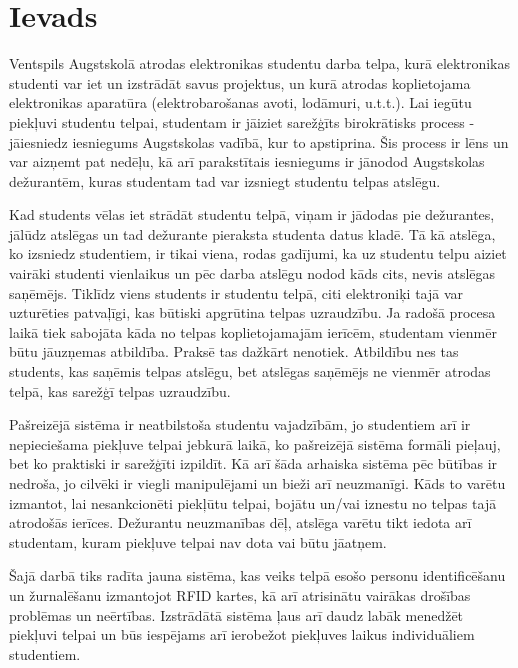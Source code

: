 \chapter*{Ievads}


Ventspils Augstskolā atrodas elektronikas studentu darba telpa, kurā elektronikas studenti var iet un izstrādāt savus projektus, un kurā atrodas koplietojama elektronikas aparatūra (elektrobarošanas avoti, lodāmuri, u.t.t.). Lai iegūtu piekļuvi studentu telpai, studentam ir jāiziet sarežģīts birokrātisks process - jāiesniedz iesniegums Augstskolas vadībā, kur to apstiprina. Šis process ir lēns un var aizņemt pat nedēļu, kā arī parakstītais iesniegums ir jānodod Augstskolas dežurantēm, kuras studentam tad var izsniegt studentu telpas atslēgu.

Kad students vēlas iet strādāt studentu telpā, viņam ir jādodas pie dežurantes, jālūdz atslēgas un tad dežurante pieraksta studenta datus kladē. Tā kā atslēga, ko izsniedz studentiem, ir tikai viena, rodas gadījumi, ka uz studentu telpu aiziet vairāki studenti vienlaikus un pēc darba atslēgu nodod kāds cits, nevis atslēgas saņēmējs. Tiklīdz viens students ir studentu telpā, citi elektroniķi tajā var uzturēties patvaļīgi, kas būtiski apgrūtina telpas uzraudzību. Ja radošā procesa laikā tiek sabojāta kāda no telpas koplietojamajām ierīcēm, studentam vienmēr būtu jāuzņemas atbildība. Praksē tas dažkārt nenotiek. Atbildību nes tas students, kas saņēmis telpas atslēgu, bet atslēgas saņēmējs ne vienmēr atrodas telpā, kas sarežģī telpas uzraudzību.

Pašreizējā sistēma ir neatbilstoša studentu vajadzībām, jo studentiem arī ir nepieciešama piekļuve telpai jebkurā laikā, ko pašreizējā sistēma formāli pieļauj, bet ko praktiski ir sarežģīti izpildīt. Kā arī šāda arhaiska sistēma pēc būtības ir nedroša, jo cilvēki ir viegli manipulējami un bieži arī neuzmanīgi. Kāds to varētu izmantot, lai nesankcionēti piekļūtu telpai, bojātu un/vai iznestu no telpas tajā atrodošās ierīces. Dežurantu neuzmanības dēļ, atslēga varētu tikt iedota arī studentam, kuram piekļuve telpai nav dota vai būtu jāatņem.

Šajā darbā tiks radīta jauna sistēma, kas veiks telpā esošo personu identificēšanu un žurnalēšanu izmantojot RFID kartes, kā arī atrisinātu vairākas drošības problēmas un neērtības. Izstrādātā sistēma ļaus arī daudz labāk menedžēt piekļuvi telpai un būs iespējams arī ierobežot piekļuves laikus individuāliem studentiem.

